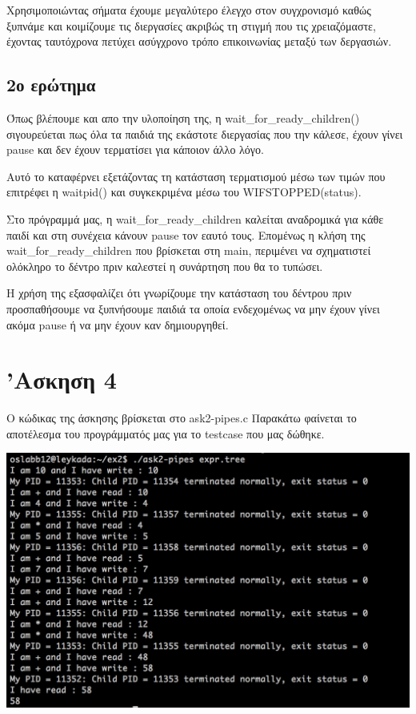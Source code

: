 \documentclass[12pt]{article}
\begin{document}
Χρησιμοποιώντας σήματα έχουμε μεγαλύτερο έλεγχο στον συγχρονισμό καθώς ξυπνάμε και κοιμίζουμε τις διεργασίες ακριβώς τη στιγμή που τις χρειαζόμαστε, έχοντας ταυτόχρονα πετύχει ασύγχρονο τρόπο επικοινωνίας μεταξύ των δεργασιών.

\subsection*{2ο ερώτημα}

Όπως βλέπουμε και απο την υλοποίηση της, η \textlatin{wait\_for\_ready\_children()} σιγουρεύεται πως όλα τα παιδιά της εκάστοτε 
διεργασίας που την κάλεσε, έχουν γίνει \textlatin{pause} και δεν έχουν τερματίσει για κάποιον άλλο λόγο.

Αυτό το καταφέρνει εξετάζοντας τη κατάσταση τερματισμού μέσω των τιμών που επιτρέφει η \textlatin{waitpid()} και συγκεκριμένα μέσω του \textlatin{WIFSTOPPED(status)}. 

Στο πρόγραμμά μας, η \textlatin{wait\_for\_ready\_children} καλείται αναδρομικά για κάθε παιδί και στη συνέχεια κάνουν \textlatin{pause} τον εαυτό τους. Επομένως η κλήση της \textlatin{wait\_for\_ready\_children} που βρίσκεται στη \textlatin{main}, περιμένει να σχηματιστεί ολόκληρο το δέντρο πριν καλεστεί η συνάρτηση που θα το τυπώσει. 

Η χρήση της εξασφαλίζει ότι γνωρίζουμε την κατάσταση του δέντρου πριν προσπαθήσουμε να ξυπνήσουμε παιδιά τα οποία ενδεχομένως να μην έχουν γίνει ακόμα \textlatin{pause} ή να μην έχουν καν δημιουργηθεί.


\section*{'Ασκηση 4}

Ο κώδικας της άσκησης βρίσκεται στο \textlatin{ask2-pipes.c}
Παρακάτω φαίνεται το αποτέλεσμα του προγράμματός μας για το \textlatin{testcase} που μας δώθηκε.

\includegraphics[scale=0.5]{ask2-pipes.png}
\end{document}
